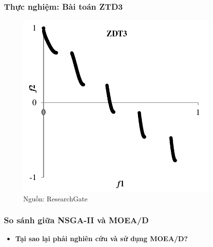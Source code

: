 \documentclass{beamer}
\begin{document}
    \begin{frame} 
    \frametitle{\textbf{Thực nghiệm: Bài toán ZTD3}}
        \begin{figure}[!h]
            \center
            \includegraphics[width=0.6\linewidth]{zdt3-pf}
            \caption{Nguồn: ResearchGate}
        \end{figure}

    \end{frame}

    
    \begin{frame}
    \frametitle{\textbf{So sánh giữa NSGA-II và MOEA/D}}
        \begin{itemize}[label={}]
        \begin{itemize}
            \item<1-> Độ phức tạp mỗi lần chạy của MOEA/D nhỏ hơn NSGA-II.
            \item<2-> NSGA-II chỉ cần một hệ số ngoài là mật độ đột biến (mutation rate) khi chạy thuật toán.
            \item<3-> NSGA-II hội tụ tới biên Parento nhanh hơn.
            \item<4-> NSGA-II đảm bảo kích cỡ quần thể cố định $\implies$ dễ quản lý và lưu trữ hơn.
        \end{itemize}
        \item<5-> \textbf{Tại sao lại phải nghiên cứu và sử dụng MOEA/D?}
        \end{itemize}
    \end{frame}

\end{document}

